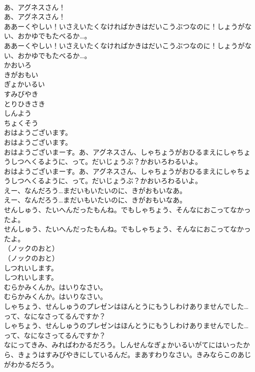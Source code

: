 \documentclass[8pt]{extreport}
\begin{document}
\begin{CJK}{UTF8}{min}
\\	あ、アグネスさん！	
\\	あ、アグネスさん！ 
\\	ああーくやしい！いさえいたくなければかきはだいこうぶつなのに！しょうがない、おかゆでもたべるか…。	
\\	ああーくやしい！いさえいたくなければかきはだいこうぶつなのに！しょうがない、おかゆでもたべるか…。 
\\	かおいろ
\\	きがおもい
\\	ぎょかいるい
\\	すみびやき
\\	とりひきさき
\\	しんよう
\\	ちょくそう
\\	おはようございます。	
\\	おはようございます。 
\\	おはようございまーす。あ、アグネスさん、しゃちょうがおひるまえにしゃちょうしつへくるように、って。だいじょうぶ？かおいろわるいよ。	
\\	おはようございまーす。あ、アグネスさん、しゃちょうがおひるまえにしゃちょうしつへくるように、って。だいじょうぶ？かおいろわるいよ。 
\\	えー、なんだろう…まだいもいたいのに、きがおもいなあ。	
\\	えー、なんだろう…まだいもいたいのに、きがおもいなあ。 
\\	せんしゅう、たいへんだったもんね。でもしゃちょう、そんなにおこってなかったよ。	
\\	せんしゅう、たいへんだったもんね。でもしゃちょう、そんなにおこってなかったよ。 
\\	（ノックのおと）	
\\	（ノックのおと） 
\\	しつれいします。	
\\	しつれいします。 
\\	むらかみくんか。はいりなさい。	
\\	むらかみくんか。はいりなさい。 
\\	しゃちょう、せんしゅうのプレゼンはほんとうにもうしわけありませんでした…って、なになさってるんですか？	
\\	しゃちょう、せんしゅうのプレゼンはほんとうにもうしわけありませんでした…って、なになさってるんですか？ 
\\	なにってきみ、みればわかるだろう。しんせんなぎょかいるいがてにはいったから、きょうはすみびやきにしているんだ。まあすわりなさい。きみならこのあじがわかるだろう。	

\end{CJK}
\end{document}
